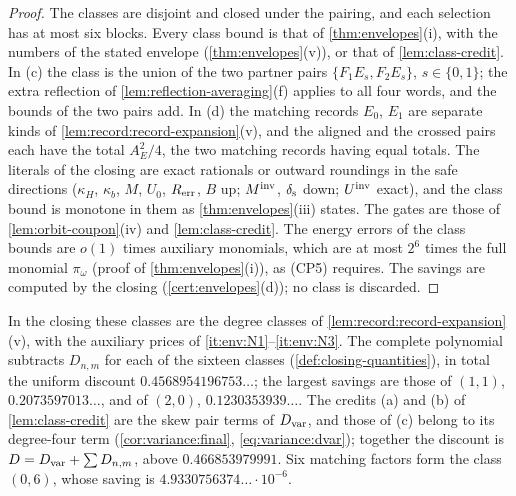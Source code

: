 \begin{proof}
The classes are disjoint and closed under the pairing, and each selection has at
most six blocks. Every class bound is that of \cref{thm:envelopes}(i), with the numbers
of the stated envelope (\cref{thm:envelopes}(v)), or that of \cref{lem:class-credit}. In
(c) the class is the union of the two partner pairs $\{F_1E_s,F_2E_s\}$, $s\in\{0,1\}$; the
extra reflection of \cref{lem:reflection-averaging}(f) applies to all four words, and the
bounds of the two pairs add. In (d) the matching records $E_0$, $E_1$ are separate kinds
of \cref{lem:record:record-expansion}(v), and the aligned and the crossed pairs each
have the total $A_E^2/4$, the two matching records having equal totals. The literals of
the closing are exact rationals or outward roundings in the safe directions
($\kappa_H$, $\kappa_b$, $M$, $U_0$, $R_{\rm err}$, $B$ up; $M^{\rm inv}$, $\delta_{\rm s}$ down; $U^{\mathrm{inv}}$
exact), and the class bound is monotone in them as \cref{thm:envelopes}(iii) states.
The gates are those of \cref{lem:orbit-coupon}(iv) and \cref{lem:class-credit}. The
energy errors of the class bounds are $o(1)$ times auxiliary monomials, which are at
most $2^6$ times the full monomial $\pi_\omega$ (proof of \cref{thm:envelopes}(i)), as (CP5)
requires. The savings are computed by the closing (\cref{cert:envelopes}(d)); no class
is discarded.
\end{proof}

In the closing these classes are the degree classes of
\cref{lem:record:record-expansion}(v), with the auxiliary prices of
\ref{it:env:N1}--\ref{it:env:N3}. The complete polynomial subtracts $D_{n,m}$ for each of
the sixteen classes (\cref{def:closing-quantities}), in total the uniform discount
$0.4568954196753\ldots$; the largest savings are those of $(1,1)$, $0.2073597013\ldots$, and
of $(2,0)$, $0.1230353939\ldots$. The credits (a) and (b) of \cref{lem:class-credit} are the
skew pair terms of $D_{\rm var}$, and those of (c) belong to its degree-four term
(\cref{cor:variance:final}, \eqref{eq:variance:dvar}); together the discount is
$D=D_{\rm var}+\sum D_{n,m}$, above $0.466853979991$. Six matching factors form the class
$(0,6)$, whose saving is $4.9330756374\ldots\cdot10^{-6}$.

